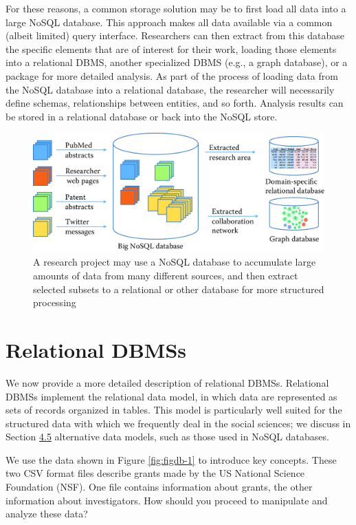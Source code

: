 \documentclass[]{krantz}
\begin{document}
For these reasons, a common storage solution may be to first load all
data into a large NoSQL database. This approach makes all data available
via a common (albeit limited) query interface. Researchers can then
extract from this database the specific elements that are of interest
for their work, loading those elements into a relational DBMS, another
specialized DBMS (e.g., a graph database), or a package for more
detailed analysis. As part of the process of loading data from the NoSQL
database into a relational database, the researcher will necessarily
define schemas, relationships between entities, and so forth. Analysis
results can be stored in a relational database or back into the NoSQL
store.

\begin{figure}

{\centering \includegraphics[width=0.7\linewidth]{ChapterDB/figures/data-fig2} 

}

\caption{A research project may use a NoSQL database to accumulate large amounts of data from many different sources, and then extract selected subsets to a relational or other database for more structured processing}\label{fig:figdb-dbs}
\end{figure}

\section{Relational DBMSs}\label{relational-dbmss}

We now provide a more detailed description of relational DBMSs.
Relational DBMSs implement the relational data model, in which data are
represented as sets of records organized in tables. This model is
particularly well suited for the structured data with which we
frequently deal in the social sciences; we discuss in Section
\protect\hyperlink{sec:db:nosql}{4.5} alternative data models, such as
those used in NoSQL databases.

We use the data shown in Figure \ref{fig:figdb-1} to introduce key
concepts. These two CSV format files describe grants made by the US
National Science Foundation (NSF). One file contains information about
grants, the other information about investigators. How should you
proceed to manipulate and analyze these data?
\end{document}
